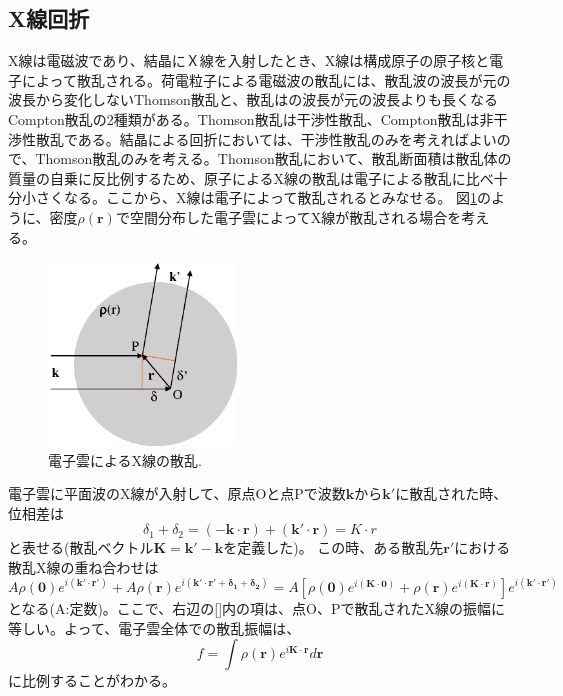 \documentclass[11pt,a4j,uplatex]{jsarticle}
\begin{document}
\newpage
\subsection{X線回折}%
X線は電磁波であり、結晶にＸ線を入射したとき、X線は構成原子の原子核と電子によって散乱される。荷電粒子による電磁波の散乱には、散乱波の波長が元の波長から変化しないThomson散乱と、散乱はの波長が元の波長よりも長くなるCompton散乱の2種類がある。Thomson散乱は干渉性散乱、Compton散乱は非干渉性散乱である。結晶による回折においては、干渉性散乱のみを考えればよいので、Thomson散乱のみを考える。Thomson散乱において、散乱断面積は散乱体の質量の自乗に反比例するため、原子によるX線の散乱は電子による散乱に比べ十分小さくなる。ここから、X線は電子によって散乱されるとみなせる。
図\ref{sanran}のように、密度$\rho(\bm{r})$で空間分布した電子雲によってX線が散乱される場合を考える。
\begin{figure}[htb]
 \centering
 \includegraphics[clip,width=5cm]{sanran.eps}
 \caption{電子雲によるX線の散乱.}
 \label{sanran}
\end{figure}

電子雲に平面波のX線が入射して、原点Oと点Pで波数$\bm{k}$から$\bm{k}'$に散乱された時、位相差は
\begin{equation}
 \delta_1+\delta_2=\bm{(-k\cdot r)+(k'\cdot r)}=K\cdot r
\end{equation}
と表せる(散乱ベクトル$\bm{K=k'-k}$を定義した)。
この時、ある散乱先$\bm{r'}$における散乱X線の重ね合わせは
\begin{equation}
 A\rho\bm{(0)}e^{i(\bm{k'\cdot r'})}+  A\rho\bm{(r)}e^{i(\bm{k'\cdot r'+\delta_1+\delta_2})}=A[\rho\bm{(0)}e^{i(\bm{K\cdot 0})}+\rho\bm{(r)}e^{i(\bm{K\cdot r})}]e^{i(\bm{k'\cdot r'})}
\end{equation}
となる(A:定数)。ここで、右辺の[]内の項は、点O、Pで散乱されたX線の振幅に等しい。よって、電子雲全体での散乱振幅は、
\begin{equation}
 f=\int\rho(\bm{r})e^{i\bm{K\cdot r}}d\bm{r}
 \label{insi}
\end{equation}
に比例することがわかる。
\end{document}
